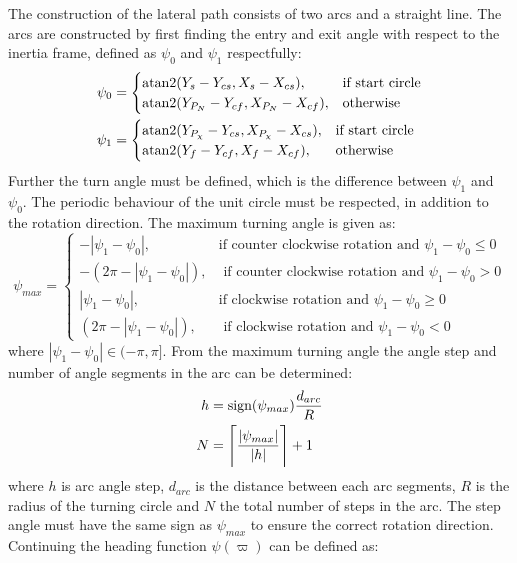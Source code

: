 The construction of the lateral path consists of two arcs and a straight line. The arcs are constructed by first finding the entry and exit angle with respect to the inertia frame, defined as $\psi_0$ and $\psi_1$ respectfully:
\begin{subequations}
\begin{align}
\psi_0 &= \begin{cases}
\atan2(Y_s-Y_{cs},X_s-X_{cs}), & \text{if start circle} \\
\atan2(Y_{P_N}-Y_{cf},X_{P_N}-X_{cf}), & \text{otherwise}
\end{cases}\\
\psi_1 &= \begin{cases}
\atan2(Y_{P_\chi}-Y_{cs},X_{P_{\chi}}-X_{cs}), & \text{if start circle} \\
\atan2(Y_{f}-Y_{cf},X_{f}-X_{cf}), & \text{otherwise}
\end{cases}
\end{align}
\end{subequations}
Further the turn angle must be defined, which is the difference between $\psi_1$ and $\psi_0$. The periodic behaviour of the unit circle must be respected, in addition to the rotation direction. The maximum turning angle is given as:
\begin{equation}
\psi_{max} = \begin{cases}
-|\psi_1 - \psi_0|, & \text{if counter clockwise rotation and } \psi_1 - \psi_0 \leq 0 \\
-(2\pi - |\psi_1-\psi_0|), & \text{ if counter clockwise rotation and } \psi_1 - \psi_0 > 0 \\
|\psi_1 - \psi_0|, & \text{if clockwise rotation and } \psi_1 - \psi_0 \geq 0 \\
(2\pi - |\psi_1-\psi_0|), & \text{ if clockwise rotation and } \psi_1 - \psi_0 < 0
\end{cases}
\end{equation}
where $|\psi_1-\psi_0| \in(-\pi,\pi]$. From the maximum turning angle the angle step and number of angle segments in the arc can be determined:
\begin{subequations}
\begin{align}
h &= \text{sign}(\psi_{max})\frac{d_{arc}}{R} \\
N &= \ceil[\Bigg]{\frac{|\psi_{max}|}{|h|}} + 1
\end{align}
\end{subequations}
where $h$ is arc angle step, $d_{arc}$ is the distance between each arc segments, $R$ is the radius of the turning circle and $N$ the total number of steps in the arc. The step angle must have the same sign as $\psi_{max}$ to ensure the correct rotation direction. Continuing the heading function $\psi(\varpi)$ can be defined as:
